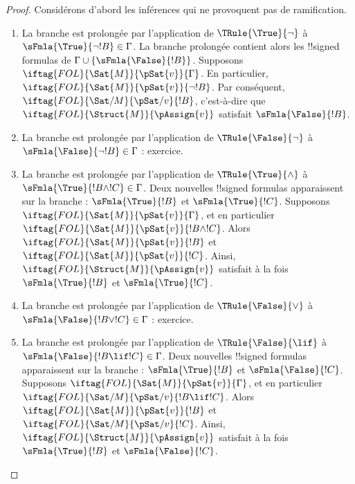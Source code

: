 \documentclass[../../../include/open-logic-section]{subfiles}
\begin{document}
\begin{proof}
Considérons d'abord les inférences qui ne provoquent pas de ramification.
\begin{enumerate}
\item La branche est prolongée par l'application de
  $\TRule{\True}{\lnot}$ à
  $\sFmla{\True}{\lnot !B} \in \Gamma$. La branche prolongée contient
  alors les !!{signed formula}s de
  $\Gamma \cup \{\sFmla{\False}{!B}\}$. Supposons
  $\iftag{FOL}{\Sat{M}}{\pSat{v}}{\Gamma}$. En particulier,
  $\iftag{FOL}{\Sat{M}}{\pSat{v}}{\lnot !B}$. Par conséquent,
  $\iftag{FOL}{\Sat/{M}}{\pSat/{v}}{!B}$, c'est-à-dire que
  $\iftag{FOL}{\Struct{M}}{\pAssign{v}}$ satisfait
  $\sFmla{\False}{!B}$.
\item La branche est prolongée par l'application de
  $\TRule{\False}{\lnot}$ à
  $\sFmla{\False}{\lnot !B} \in \Gamma$ : exercice.
\item La branche est prolongée par l'application de
  $\TRule{\True}{\land}$ à
  $\sFmla{\True}{!B \land !C} \in \Gamma$. Deux nouvelles
  !!{signed formula}s apparaissent sur la branche :
  $\sFmla{\True}{!B}$ et $\sFmla{\True}{!C}$. Supposons
  $\iftag{FOL}{\Sat{M}}{\pSat{v}}{\Gamma}$, et en particulier
  $\iftag{FOL}{\Sat{M}}{\pSat{v}}{!B \land !C}$. Alors
  $\iftag{FOL}{\Sat{M}}{\pSat{v}}{!B}$ et
  $\iftag{FOL}{\Sat{M}}{\pSat{v}}{!C}$. Ainsi,
  $\iftag{FOL}{\Struct{M}}{\pAssign{v}}$ satisfait à la fois
  $\sFmla{\True}{!B}$ et $\sFmla{\True}{!C}$.
\item La branche est prolongée par l'application de
  $\TRule{\False}{\lor}$ à
  $\sFmla{\False}{!B \lor !C} \in \Gamma$ : exercice.
\item La branche est prolongée par l'application de
  $\TRule{\False}{\lif}$ à
  $\sFmla{\False}{!B \lif !C} \in \Gamma$. Deux nouvelles
  !!{signed formula}s apparaissent sur la branche :
  $\sFmla{\True}{!B}$ et $\sFmla{\False}{!C}$. Supposons
  $\iftag{FOL}{\Sat{M}}{\pSat{v}}{\Gamma}$, et en particulier
  $\iftag{FOL}{\Sat/{M}}{\pSat/{v}}{!B \lif !C}$. Alors
  $\iftag{FOL}{\Sat{M}}{\pSat{v}}{!B}$ et
  $\iftag{FOL}{\Sat/{M}}{\pSat/{v}}{!C}$. Ainsi,
  $\iftag{FOL}{\Struct{M}}{\pAssign{v}}$ satisfait à la fois
  $\sFmla{\True}{!B}$ et $\sFmla{\False}{!C}$.

\end{enumerate}
\end{proof}
\end{document}
